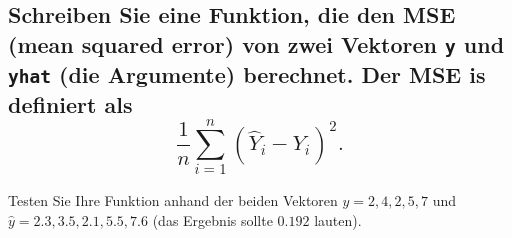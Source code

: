 \documentclass[12pt,a4paper]{article}
\begin{document}
\hypertarget{schreiben-sie-eine-funktion-die-den-mse-mean-squared-error-von-zwei-vektoren-y-und-yhat-die-argumente-berechnet.-der-mse-is-definiert-als-displaystyle-frac1nsum_i1n-haty_i---y_i2.}{%
\subsection{\texorpdfstring{Schreiben Sie eine Funktion, die den MSE
(mean squared error) von zwei Vektoren \texttt{y} und \texttt{yhat} (die
Argumente) berechnet. Der MSE is definiert als
\[\displaystyle \frac{1}{n}\sum_{i=1}^n (\hat{Y}_i - Y_i)^2.\]}{Schreiben Sie eine Funktion, die den MSE (mean squared error) von zwei Vektoren y und yhat (die Argumente) berechnet. Der MSE is definiert als \textbackslash displaystyle \textbackslash frac\{1\}\{n\}\textbackslash sum\_\{i=1\}\^{}n (\textbackslash hat\{Y\}\_i - Y\_i)\^{}2.}}\label{schreiben-sie-eine-funktion-die-den-mse-mean-squared-error-von-zwei-vektoren-y-und-yhat-die-argumente-berechnet.-der-mse-is-definiert-als-displaystyle-frac1nsum_i1n-haty_i---y_i2.}}

Testen Sie Ihre Funktion anhand der beiden Vektoren
\(y = {2, 4, 2, 5, 7}\) und \(\hat{y}= {2.3, 3.5, 2.1, 5.5, 7.6}\) (das
Ergebnis sollte \(0.192\) lauten).
\end{document}
